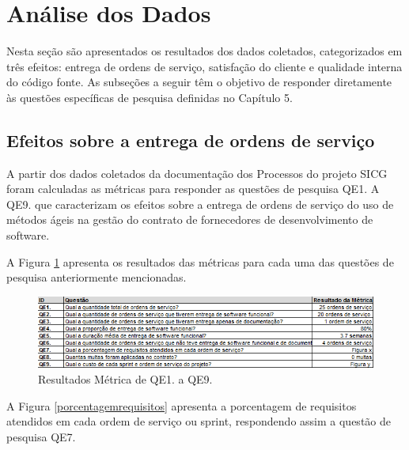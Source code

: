 \section[Análise dos Dados]{Análise dos Dados}

Nesta seção são apresentados os resultados dos dados coletados, categorizados em três efeitos: entrega de ordens de serviço, satisfação do cliente e qualidade interna do código fonte. As subseções a seguir têm o objetivo de responder diretamente às questões específicas de pesquisa definidas no Capítulo 5.

\subsection[Efeitos sobre a entrega de ordens de serviço]{Efeitos sobre a entrega de ordens de serviço}

A partir dos dados coletados da documentação dos Processos do projeto SICG foram calculadas as métricas para responder as questões de pesquisa QE1. A QE9. que caracterizam os efeitos sobre a entrega de ordens de serviço do uso de métodos ágeis na gestão do contrato de fornecedores de desenvolvimento de software.

A Figura \ref{resultadosmetricas} apresenta os resultados das métricas para cada uma das questões de pesquisa anteriormente mencionadas.

\begin{figure}[H]
		\centering
			\includegraphics[scale=1.0]{figuras/resultadosmetricas.png}
		\caption{Resultados Métrica de QE1. a QE9.}
		\label{resultadosmetricas}
\end{figure}

\textcolor{red}{}

A Figura \ref{porcentagemrequisitos} apresenta a porcentagem de requisitos atendidos em cada ordem de serviço ou sprint, respondendo assim a questão de pesquisa QE7.

